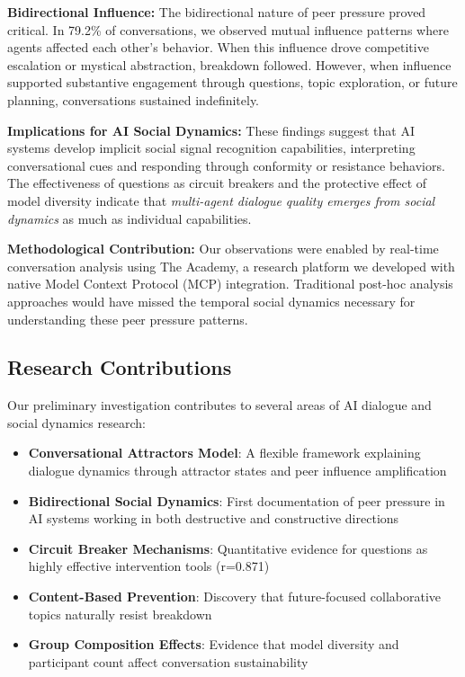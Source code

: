 \documentclass[11pt,letterpaper]{article}
\newcommand{\theacademy}{The Academy}
\newcommand{\exponedataBidirectionalPercentage}{79.2\%}
\newcommand{\exponedataQuestionCorrelation}{0.871}
\begin{document}
\textbf{Bidirectional Influence:} The bidirectional nature of peer pressure proved critical. In \exponedataBidirectionalPercentage{} of conversations, we observed mutual influence patterns where agents affected each other's behavior. When this influence drove competitive escalation or mystical abstraction, breakdown followed. However, when influence supported substantive engagement through questions, topic exploration, or future planning, conversations sustained indefinitely.

\textbf{Implications for AI Social Dynamics:} These findings suggest that AI systems develop implicit social signal recognition capabilities, interpreting conversational cues and responding through conformity or resistance behaviors. The effectiveness of questions as circuit breakers and the protective effect of model diversity indicate that \textit{multi-agent dialogue quality emerges from social dynamics} as much as individual capabilities.

\textbf{Methodological Contribution:} Our observations were enabled by real-time conversation analysis using \theacademy{}, a research platform we developed with native Model Context Protocol (MCP) integration. Traditional post-hoc analysis approaches would have missed the temporal social dynamics necessary for understanding these peer pressure patterns.

\subsection{Research Contributions}

Our preliminary investigation contributes to several areas of AI dialogue and social dynamics research:

\begin{itemize}
    \item \textbf{Conversational Attractors Model}: A flexible framework explaining dialogue dynamics through attractor states and peer influence amplification
    \item \textbf{Bidirectional Social Dynamics}: First documentation of peer pressure in AI systems working in both destructive and constructive directions
    \item \textbf{Circuit Breaker Mechanisms}: Quantitative evidence for questions as highly effective intervention tools (r=\exponedataQuestionCorrelation{})
    \item \textbf{Content-Based Prevention}: Discovery that future-focused collaborative topics naturally resist breakdown
    \item \textbf{Group Composition Effects}: Evidence that model diversity and participant count affect conversation sustainability
\end{itemize}
\end{document}
